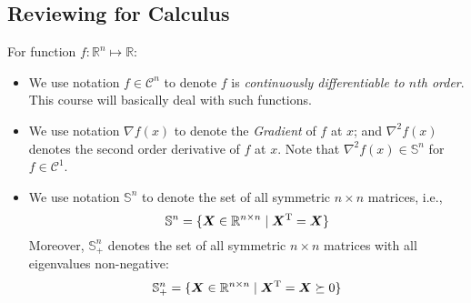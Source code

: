 \subsection{Reviewing for Calculus}
For function $f:\mathbb{R}^n\mapsto\mathbb{R}$:
\begin{itemize}
\item
We use notation $f\in\mathcal{C}^n$ to denote $f$ is \emph{continuously differentiable to $n$th order}. This course will basically deal with such functions.
\item
We use notation $\nabla f(x)$ to denote the \emph{Gradient} of $f$ at $x$; and $\nabla^2 f(x)$ denotes the second order derivative of $f$ at $x$. Note that $\nabla^2 f(x)\in\mathbb{S}^n$ for $f\in\mathcal{C}^1$.
\item
We use notation $\mathbb{S}^n$ to denote the set of all symmetric $n\times n$ matrices, i.e., 
\[
\mathbb{S}^n=\{\bm X\in\mathbb{R}^{n\times n}\mid \bm X^{\mathrm T}=\bm X\}
\]
Moreover, $\mathbb{S}^n_+$ denotes the set of all symmetric $n\times n$ matrices with all eigenvalues non-negative:
\[
\mathbb{S}^n_+=\{\bm X\in\mathbb{R}^{n\times n}\mid \bm X^{\mathrm T}=\bm X\succeq0\}
\]
\end{itemize}
